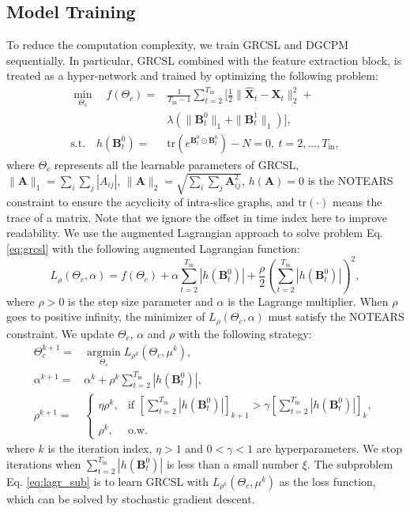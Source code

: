\documentclass[letterpaper, 10 pt, conference]{ieeeconf}
\begin{document}
\subsection{Model Training}
To reduce the computation complexity, we train GRCSL and DGCPM sequentially. In particular, GRCSL combined with the feature extraction block, is treated as a hyper-network and trained by optimizing the following problem:
\begin{equation}
        \label{eq:grcsl}
        \begin{aligned}
                \min_{\Theta_{c}}\quad f(\Theta_c)=&\frac{1}{T_\text{in}-1}\sum_{t=2}^{T_\text{in}}\big[\frac{1}{2}\|\hat{\mathbf{X}}_t-\mathbf{X}_t\|_2^2+\\
                &\lambda\left(\|\mathbf{B}^0_t\|_1+\|\mathbf{B}^1_t\|_1\right)\big],\\  
                \text{s.t.}\quad h(\mathbf{B}^0_t)=&\text{tr}(e^{\mathbf{B}^0_t\odot\mathbf{B}^0_t})-N=0,\ t=2,...,T_\text{in},
        \end{aligned}
\end{equation}
where $\Theta_c$ represents all the learnable parameters of GRCSL, $\|\mathbf{A}\|_1=\sum_i\sum_j|A_{ij}|$, $\|\mathbf{A}\|_2=\sqrt{\sum_i\sum_j\mathbf{A}_{ij}^2}$, $h(\mathbf{A})=0$ is the NOTEARS constraint to ensure the acyclicity of intra-slice graphs, and $\text{tr}(\cdot)$ means the trace of a matrix. Note that we ignore the offset in time index here to improve readability. We use the augmented Lagrangian approach to solve problem Eq. \eqref{eq:grcsl} with the following augmented Lagrangian function\cite{yu2019dag}:
\begin{equation}
        L_\rho(\Theta_c,\alpha)=f(\Theta_c)+\alpha \sum_{t=2}^{T_\text{in}}|h(\mathbf{B}_t^0)|+\frac{\rho}{2}\left(\sum_{t=2}^{T_\text{in}}|h(\mathbf{B}^0_t)|\right)^2,
\end{equation}
where $\rho>0$ is the step size parameter and $\alpha$ is the Lagrange multiplier. When $\rho$ goes to positive infinity, the minimizer of $L_\rho(\Theta_c,\alpha)$ must satisfy the NOTEARS constraint. We update $\Theta_c$, $\alpha$ and $\rho$ with the following strategy:
\begin{align}
        \label{eq:lagr_sub}
        \Theta_c^{k+1}=&\underset{\Theta_c}{\operatorname{argmin}}L_{\rho^k}(\Theta_c,\mu^k),\\
        \alpha^{k+1}=&\alpha^k+\rho^k\sum_{t=2}^{T_\text{in}}|h(\mathbf{B}_t^0)|,\\
        \rho^{k+1}=&\begin{cases}
                \eta\rho^k,&\text{if $\left[\sum_{t=2}^{T_\text{in}}|h(\mathbf{B}_t^0)|\right]_{k+1}>\gamma \left[\sum_{t=2}^{T_\text{in}}|h(\mathbf{B}_t^0)|\right]_{k}$},\\
                \rho^k,&\text{o.w.}
        \end{cases}
\end{align}
where $k$ is the iteration index, $\eta > 1$ and $0<\gamma< 1$ are hyperparameters. We stop iterations when $\sum_{t=2}^{T_\text{in}}|h(\mathbf{B}_t^0)|$ is less than a small number $\xi$. The subproblem Eq. \eqref{eq:lagr_sub} is to learn GRCSL with $L_{\rho^k}(\Theta_c,\mu^k)$ as the loss function, which can be solved by stochastic gradient descent.
\end{document}
